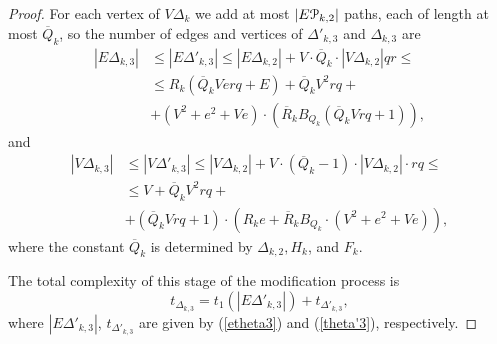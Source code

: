 \documentclass[a4paper,12pt]{article}
\newcommand{\G}{\Gamma }
\newcommand{\D}{\Delta }
\newcommand{\T}{\Theta }
\newcommand{\cP}{{\cal{P}}}
\numberwithin{equation}{section}
\numberwithin{figure}{section}
\begin{document}
\begin{proof}
For each vertex of $V\D_k$ we add at most $|E\cP_{k,2}|$ paths, each of
length at most $\overline Q_k$, so the number of edges and
vertices of $\D'_{k,3}$ and $\D_{k,3}$ are
\begin{equation}\label{etheta3}
\begin{split}
|E\D_{k,3}| &\le |E\D'_{k,3}|\le |E\D_{k,2}|+ V \cdot
\overline{Q}_k\cdot |V\D_{k,2}| q r \le \\
 &\le R_k(\overline{Q}_k V  e r q + E) +
 \overline{Q}_k V^2 r q +\\
 &+ (V^2 +e^2+V e)\cdot(\overline{R}_k B_{Q_k}(\overline{Q}_k V r q +1)),
\end{split}
\end{equation}
and
\begin{equation}\label{vtheta3}
\begin{split}
|V\D_{k,3}| &\le |V \D'_{k,3}|\le |V\D_{k,2}|+ V \cdot(\overline{Q}_k-1)\cdot |V\D_{k,2}|\cdot rq \le\\
 &\le V + \overline{Q}_k V^2 rq + \\
&+(\overline{Q}_k V rq +1)\cdot(R_k e +\overline{R}_k B_{Q_k}
\cdot(V^2 + e^2 + V e)),
\end{split}
\end{equation}
where the constant $\overline{Q}_k$ is determined  by $\D_{k,2}, H_k$, and
$F_k$.


The total complexity of this stage of the modification process is
\begin{equation}\label{theta3}
t_{\D_{k,3}} = t_1(|E\D'_{k,3}|)
+ t_{\D'_{k,3}},
\end{equation}
where $|E\D'_{k,3}|$, $t_{\D'_{k,3}}$ are given by (\ref{etheta3}) and
(\ref{theta'3}), respectively.



\end{proof}
\end{document}
